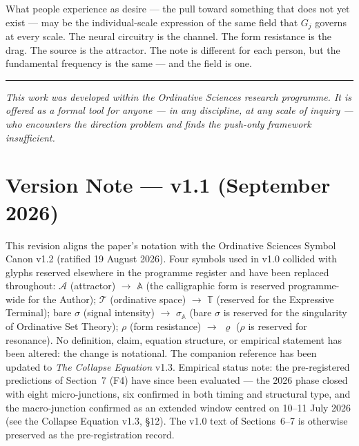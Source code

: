 \documentclass[12pt,a4paper]{article}
\newcommand{\Gj}{G_j}
\begin{document}
What people experience as desire --- the pull toward something that does not yet exist --- may be the individual-scale expression of the same field that $\Gj$ governs at every scale. The neural circuitry is the channel. The form resistance is the drag. The source is the attractor. The note is different for each person, but the fundamental frequency is the same --- and the field is one.

\vspace{1em}

\begin{center}
\rule{0.5\textwidth}{0.4pt}
\end{center}

\vspace{1em}

\noindent\textit{This work was developed within the Ordinative Sciences research programme. It is offered as a formal tool for anyone --- in any discipline, at any scale of inquiry --- who encounters the direction problem and finds the push-only framework insufficient.}



\section*{Version Note --- v1.1 (September 2026)}

This revision aligns the paper's notation with the Ordinative Sciences Symbol Canon v1.2 (ratified 19 August 2026). Four symbols used in v1.0 collided with glyphs reserved elsewhere in the programme register and have been replaced throughout: $\mathcal{A}$ (attractor) $\to$ $\mathbb{A}$ (the calligraphic form is reserved programme-wide for the Author); $\mathcal{T}$ (ordinative space) $\to$ $\mathbb{T}$ (reserved for the Expressive Terminal); bare $\sigma$ (signal intensity) $\to$ $\sigma_{\mathbb{A}}$ (bare $\sigma$ is reserved for the singularity of Ordinative Set Theory); $\rho$ (form resistance) $\to$ $\varrho$ ($\rho$ is reserved for resonance). No definition, claim, equation structure, or empirical statement has been altered: the change is notational. The companion reference has been updated to \emph{The Collapse Equation} v1.3. Empirical status note: the pre-registered predictions of Section~7 (F4) have since been evaluated --- the 2026 phase closed with eight micro-junctions, six confirmed in both timing and structural type, and the macro-junction confirmed as an extended window centred on 10--11 July 2026 (see the Collapse Equation v1.3, \S12). The v1.0 text of Sections~6--7 is otherwise preserved as the pre-registration record.
\end{document}
